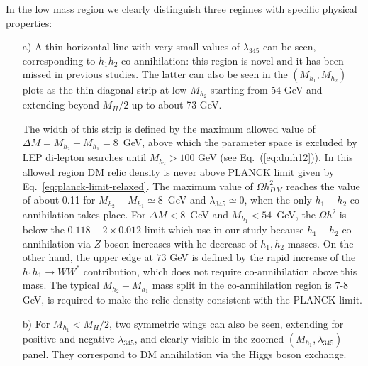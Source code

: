 \documentclass[12pt,a4paper]{article}
\newcommand {\blue} {\color{blue}}
\newcommand{\tcb}[1]{{\blue  #1}}
\begin{document}
In the low mass region we clearly distinguish three regimes with specific physical properties:
\begin{itemize}
\item[a)] A thin horizontal line with very small values of $\lambda_{345}$ can be seen, corresponding to  $h_1h_2$ co-annihilation: this region is novel and it has been missed in previous studies. 
The latter can also be seen in the $(M_{h_1},M_{h_2})$ plots as the thin diagonal strip at low $M_{h_2}$
starting from 54 GeV and extending beyond $M_H/2$ up to about 73 GeV.
%
%


\tcb{The width of this strip is defined by 
the maximum allowed value of $\Delta M = M_{h_2}-M_{h_1}=8$~GeV, above which
the parameter space is excluded by LEP di-lepton searches until $M_{h_2} > 100$ GeV (see Eq.~(\ref{eq:dmh12})). 
In this allowed region DM relic density is never above PLANCK limit given by Eq.~\ref{eq:planck-limit-relaxed}.
The maximum value of $\Omega h^2_{DM}$ reaches
the value of about 0.11 for  $M_{h_2}-M_{h_1} \simeq 8$~GeV
and $\lambda_{345}\simeq 0$, when the only 
${h}_1-{h}_2$ co-annihilation takes place.
For  $\Delta M<8$~GeV
and $M_{h_1}<54$~GeV, the $\Omega h^2$ is below the $0.118-2\times0.012$ limit which use in our study
because ${h}_1-{h}_2$ co-annihilation via $Z$-boson increases 
with  he decrease of ${h}_1,{h}_2$ masses.
On the other hand, the upper edge
at $73$ GeV is defined by the rapid increase of the  $h_1 h_1 \to W W^*$ contribution,
which does not require co-annihilation above this mass. The typical $M_{h_2}-M_{h_1}$
mass split in the co-annihilation region is 7-8 GeV, is required to make the relic density 
consistent with the PLANCK limit.
}

\item[b)] For $M_{h_1}< M_H/2$, two symmetric wings can also be seen, extending for positive and negative $\lambda_{345}$, and 
clearly visible in the zoomed $(M_{h_1},\lambda_{345})$ panel. They correspond to DM annihilation via the Higgs boson exchange. 


\end{itemize}
\end{document}
